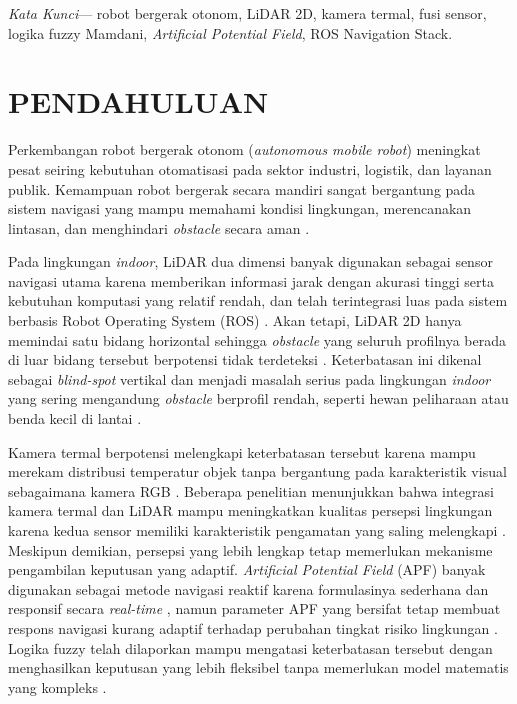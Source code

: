 \documentclass[10pt,twocolumn]{article}
\begin{document}
\noindent\textit{Kata Kunci}— robot bergerak otonom, LiDAR 2D, kamera termal, fusi sensor, logika fuzzy Mamdani, \textit{Artificial Potential Field}, ROS Navigation Stack.

\vspace{2mm}

\section{PENDAHULUAN}

Perkembangan robot bergerak otonom (\textit{autonomous mobile robot}) meningkat pesat seiring kebutuhan otomatisasi pada sektor industri, logistik, dan layanan publik. Kemampuan robot bergerak secara mandiri sangat bergantung pada sistem navigasi yang mampu memahami kondisi lingkungan, merencanakan lintasan, dan menghindari \textit{obstacle} secara aman \cite{Liu2024,Macenski2022}.

Pada lingkungan \textit{indoor}, LiDAR dua dimensi banyak digunakan sebagai sensor navigasi utama karena memberikan informasi jarak dengan akurasi tinggi serta kebutuhan komputasi yang relatif rendah, dan telah terintegrasi luas pada sistem berbasis Robot Operating System (ROS) \cite{Macenski2022}. Akan tetapi, LiDAR 2D hanya memindai satu bidang horizontal sehingga \textit{obstacle} yang seluruh profilnya berada di luar bidang tersebut berpotensi tidak terdeteksi \cite{Fagundes2024}. Keterbatasan ini dikenal sebagai \textit{blind-spot} vertikal dan menjadi masalah serius pada lingkungan \textit{indoor} yang sering mengandung \textit{obstacle} berprofil rendah, seperti hewan peliharaan atau benda kecil di lantai \cite{Kibii2022,Fagundes2024}.

Kamera termal berpotensi melengkapi keterbatasan tersebut karena mampu merekam distribusi temperatur objek tanpa bergantung pada karakteristik visual sebagaimana kamera RGB \cite{Castro2016}. Beberapa penelitian menunjukkan bahwa integrasi kamera termal dan LiDAR mampu meningkatkan kualitas persepsi lingkungan karena kedua sensor memiliki karakteristik pengamatan yang saling melengkapi \cite{Choi2023,Schichler2025}. Meskipun demikian, persepsi yang lebih lengkap tetap memerlukan mekanisme pengambilan keputusan yang adaptif. \textit{Artificial Potential Field} (APF) banyak digunakan sebagai metode navigasi reaktif karena formulasinya sederhana dan responsif secara \textit{real-time} \cite{Khatib1986}, namun parameter APF yang bersifat tetap membuat respons navigasi kurang adaptif terhadap perubahan tingkat risiko lingkungan \cite{Lv2024}. Logika fuzzy telah dilaporkan mampu mengatasi keterbatasan tersebut dengan menghasilkan keputusan yang lebih fleksibel tanpa memerlukan model matematis yang kompleks \cite{Haider2022,Benaicha2026}.
\end{document}
